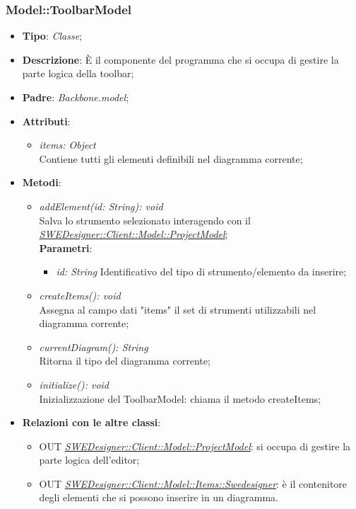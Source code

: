\documentclass[../DefinizioneDiProdotto.tex]{subfiles}
\begin{document}
				\subsubsection{Model::ToolbarModel}
				\hypertarget{SWEDesigner::Client::Model::ToolbarModel}{}
					\begin{itemize}
						\item \textbf{Tipo}: \emph{Classe};
						\item \textbf{Descrizione}: È il componente del programma che si occupa di gestire la parte logica della toolbar;
						\item \textbf{Padre}: \emph{Backbone.model};
						\item \textbf{Attributi}:
						\begin{itemize}
							\item \emph{items: Object} \\
							Contiene tutti gli elementi definibili nel diagramma corrente; \\
						\end{itemize}
						\item \textbf{Metodi}:
						\begin{itemize}
							\item \emph{addElement(id: String): void} \\
							Salva lo strumento selezionato interagendo con il \hyperlink{SWEDesigner::Client::Model::ProjectModel}{\emph{SWEDesigner::Client::Model::ProjectModel}}; \\
							\textbf{Parametri}:
							\begin{itemize}
								\item \emph{id: String}
								Identificativo del tipo di strumento/elemento da inserire; \\
							\end{itemize}
							\item \emph{createItems(): void} \\
							Assegna al campo dati "items" il set di strumenti utilizzabili nel diagramma corrente; \\
							\item \emph{currentDiagram(): String} \\
							Ritorna il tipo del diagramma corrente; \\
							\item \emph{initialize(): void} \\
							Inizializzazione del ToolbarModel: chiama il metodo createItems;
						\end{itemize}
						\item \textbf{Relazioni con le altre classi}:
						\begin{itemize}
							\item OUT \hyperlink{SWEDesigner::Client::Model::ProjectModel}{\emph{SWEDesigner::Client::Model::ProjectModel}}: si occupa di gestire la parte logica dell'editor;
							\item OUT \hyperlink{SWEDesigner::Client::Model::Items::Swedesigner}{\emph{SWEDesigner::Client::Model::Items::Swedesigner}}: è il contenitore degli elementi che si possono inserire in un diagramma.
						\end{itemize}
					\end{itemize}
\end{document}

